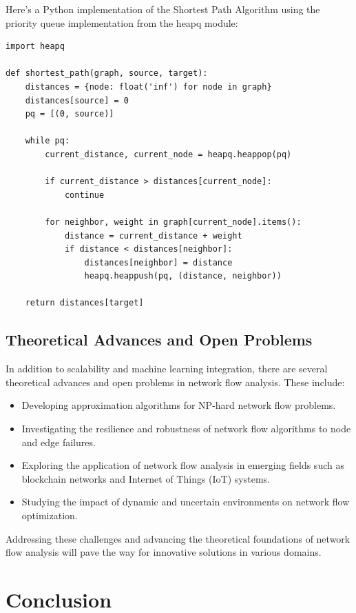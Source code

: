 \documentclass[12pt]{book} %
\begin{document}
Here's a Python implementation of the Shortest Path Algorithm using the priority queue implementation from the heapq module:
\FloatBarrier
\begin{lstlisting}
import heapq

def shortest_path(graph, source, target):
    distances = {node: float('inf') for node in graph}
    distances[source] = 0
    pq = [(0, source)]

    while pq:
        current_distance, current_node = heapq.heappop(pq)

        if current_distance > distances[current_node]:
            continue

        for neighbor, weight in graph[current_node].items():
            distance = current_distance + weight
            if distance < distances[neighbor]:
                distances[neighbor] = distance
                heapq.heappush(pq, (distance, neighbor))

    return distances[target]
\end{lstlisting}
\FloatBarrier

\subsection{Theoretical Advances and Open Problems}
In addition to scalability and machine learning integration, there are several theoretical advances and open problems in network flow analysis. These include:
\begin{itemize}
    \item Developing approximation algorithms for NP-hard network flow problems.
    \item Investigating the resilience and robustness of network flow algorithms to node and edge failures.
    \item Exploring the application of network flow analysis in emerging fields such as blockchain networks and Internet of Things (IoT) systems.
    \item Studying the impact of dynamic and uncertain environments on network flow optimization.
\end{itemize}
Addressing these challenges and advancing the theoretical foundations of network flow analysis will pave the way for innovative solutions in various domains.


\section{Conclusion}
\end{document}

